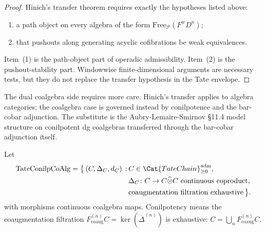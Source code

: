 \begin{proof}
  Hinich's transfer theorem requires exactly the hypotheses listed above:
  \begin{enumerate}[label=(\arabic*)]
    \item a path object on every algebra of the form
      $\mathrm{Free}_{\mathcal P}(F^w D^n)$;
    \item that pushouts along generating acyclic cofibrations be
      weak equivalences.
  \end{enumerate}
  Item~(1) is the path-object part of operadic admissibility.  Item~(2)
  is the pushout-stability part.  Windowwise finite-dimensional
  arguments are necessary tests, but they do not replace the transfer
  hypothesis in the Tate envelope.
\end{proof}

The dual coalgebra side requires more care. Hinich's transfer
applies to algebra categories; the coalgebra case is governed instead
by conilpotence and the bar-cobar adjunction.
The substitute is the Aubry-Lemaire-Smirnov \cite{loday-vallette}
\S 11.4 model structure on conilpotent dg coalgebras transferred
through the bar-cobar adjunction itself.

\begin{defn}\label{defn:tate-conilp-coalg}
  Let
  $$\begin{aligned}
  \mathrm{TateConilpCoAlg}
  =\bigl\{\,(C,\Delta_C,d_C)\,:\,&
  C\in\Cat{TateChain}_{\geq 0}^{\mathrm{adm}},\\
  &\Delta_C\colon C\to C\widehat\otimes C
    \text{ continuous coproduct},\\
  &\text{coaugmentation filtration exhaustive}\,\bigr\}.
  \end{aligned}$$
  with morphisms continuous coalgebra maps. Conilpotency means
  the coaugmentation filtration $F^{(n)}_{\mathrm{coaug}}C=
  \ker(\overline\Delta^{(n)})$ is exhaustive: $C=\bigcup_n
  F^{(n)}_{\mathrm{coaug}}C$.
\end{defn}

